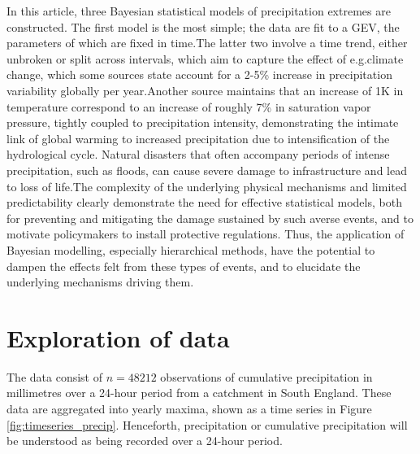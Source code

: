 \documentclass[12pt, a4paper]{article}
\begin{document}
  In this article, three Bayesian statistical models of precipitation extremes
  are constructed. The first model is the most simple; the data are fit to a
  GEV, the parameters of which are fixed in time.\@ The latter two involve a
  time trend, either unbroken or split across intervals, which aim to capture
  the effect of e.g.\@ climate change, which some sources state account for a
  2-5\% increase in precipitation variability globally per year.\@ Another
  source maintains that an increase of 1K in temperature correspond to an
  increase of roughly 7\% in saturation vapor pressure, tightly coupled to
  precipitation intensity, demonstrating the intimate link of global warming to
  increased precipitation due to intensification of the hydrological cycle.\@
  Natural disasters that often accompany periods of intense precipitation, such
  as floods, can cause severe damage to infrastructure and lead to loss of
  life.\@ The complexity of the underlying physical mechanisms and limited
  predictability clearly demonstrate the need for effective statistical models,
  both for preventing and mitigating the damage sustained by such averse
  events, and to motivate policymakers to install protective regulations.\@
  Thus, the application of Bayesian modelling, especially hierarchical methods,
  have the potential to dampen the effects felt from these types of events, and
  to elucidate the underlying mechanisms driving them.
  
  \section{Exploration of data}
  The data consist of \(n = 48212\) observations of cumulative precipitation
  in millimetres over a 24-hour period from a catchment in South England. 
  These data are aggregated into yearly maxima, shown as a time series in
  Figure \ref{fig:timeseries_precip}. Henceforth, precipitation or cumulative
  precipitation will be understood as being recorded over a 24-hour period. 
\end{document}
